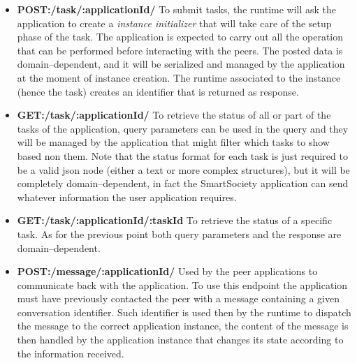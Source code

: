 \begin{itemize}
\item {\bf POST:/task/:applicationId/} To submit tasks, the runtime will ask the application to create a \textit{instance initializer} that will take care of the setup phase of the task. The application is expected to carry out all the operation that can be performed before interacting with the peers. The posted data is domain--dependent, and it will be serialized and managed by the application at the moment of instance creation. The runtime associated to the instance (hence the task) creates an identifier that is returned as response.

\item {\bf GET:/task/:applicationId/} To retrieve the status of all or part of the tasks of the application, query parameters can be used in the query and they will be managed by the application that might filter which tasks to show based non them. Note that the status format for each task is just required to be a valid json node (either a text or more complex structures), but it will be completely domain--dependent, in fact the SmartSociety application can send whatever information the user application requires.

\item {\bf GET:/task/:applicationId/:taskId} To retrieve the status of a specific task. As for the previous point both query parameters and the response are domain--dependent. 

\item {\bf POST:/message/:applicationId/} Used by the peer applications to communicate back with the application. To use this endpoint the application must have previously contacted the peer with a message containing a given conversation identifier. Such identifier is used then by the runtime to dispatch the message to the correct application instance, the content of the message is then handled by the application instance that  changes its state according to the information received.

\end{itemize}

